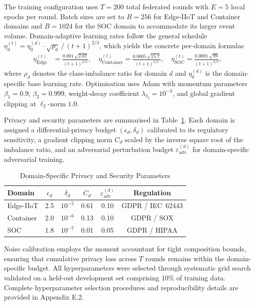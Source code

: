 \documentclass[12pt,a4paper]{article}
\theoremstyle{definition}
\begin{document}
The training configuration uses $T = 200$ total federated rounds with $E = 5$ local epochs per round. Batch sizes are set to $B = 256$ for Edge-IIoT and Container domains and $B = 1024$ for the SOC domain to accommodate its larger event volume. Domain-adaptive learning rates follow the general schedule $\eta_d^{(t)} = \eta_0^{(d)} \cdot \sqrt{\rho_d}\,/\,(t+1)^{2/3}$, which yields the concrete per-domain formulas
\begin{align}
\eta_{\text{Edge}}^{(t)} &= \frac{0.001\,\sqrt{2.67}}{(t+1)^{2/3}}, \quad
\eta_{\text{Container}}^{(t)} = \frac{0.0005\,\sqrt{15.7}}{(t+1)^{2/3}}, \quad
\eta_{\text{SOC}}^{(t)} = \frac{0.0001\,\sqrt{99}}{(t+1)^{2/3}},
\end{align}
where $\rho_d$ denotes the class-imbalance ratio for domain $d$ and $\eta_0^{(d)}$ is the domain-specific base learning rate. Optimisation uses Adam with momentum parameters $\beta_1 = 0.9$, $\beta_2 = 0.999$, weight-decay coefficient $\lambda_{\ell_2} = 10^{-3}$, and global gradient clipping at $\ell_2$-norm $1.0$.

Privacy and security parameters are summarised in Table~\ref{tab:privacy_params}. Each domain is assigned a differential-privacy budget $(\epsilon_d, \delta_d)$ calibrated to its regulatory sensitivity, a gradient clipping norm $C_d$ scaled by the inverse square root of the imbalance ratio, and an adversarial perturbation budget $\varepsilon_{\text{adv}}^{(d)}$ for domain-specific adversarial training.

\begin{table}[H]
\centering
\caption{Domain-Specific Privacy and Security Parameters}
\label{tab:privacy_params}
\small
\begin{tabular}{lccccc}
\toprule
\textbf{Domain} & $\epsilon_d$ & $\delta_d$ & $C_d$ & $\varepsilon_{\text{adv}}^{(d)}$ & \textbf{Regulation} \\
\midrule
Edge-IIoT   & 2.5 & $10^{-5}$ & 0.61 & 0.10 & GDPR / IEC~62443 \\
Container   & 2.0 & $10^{-6}$ & 0.13 & 0.10 & GDPR / SOX \\
SOC         & 1.8 & $10^{-7}$ & 0.01 & 0.05 & GDPR / HIPAA \\
\bottomrule
\end{tabular}
\end{table}

\noindent Noise calibration employs the moment accountant for tight composition bounds, ensuring that cumulative privacy loss across $T$ rounds remains within the domain-specific budget.
All hyperparameters were selected through systematic grid search validated on a held-out development set comprising 10\% of training data. Complete hyperparameter selection procedures and reproducibility details are provided in Appendix E.2.
\end{document}
